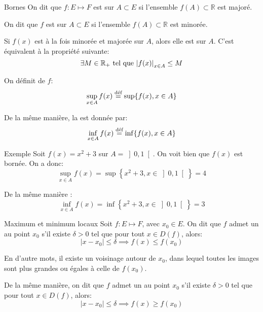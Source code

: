 \documentclass[a4paper]{article}
\begin{document}
\begin{parag}{Bornes}
    On dit que $f : E\mapsto F$ est  sur $A \subset E$ si l'ensemble $f\left(A\right) \subset \mathbb{R}$ est majoré.

    On dit que $f$ est  sur $A \subset E$ si l'ensemble $f\left(A\right) \subset \mathbb{R}$ est minorée.

    Si $f\left(x\right)$ est à la fois minorée et majorée sur $A$, alors elle est  sur $A$. C'est équivalent à la propriété suivante:
    \[\exists M \in \mathbb{R}_+ \telque \left|f\left(x\right)\right|_{x \in A} \leq M\]
    
    On définit  de $f$: 
    \[\sup_{x \in A} f\left(x\right) \over{=}{déf} \sup\left\{f\left(x\right), x \in A\right\}\]

    De la même manière, la  est donnée par: 
    \[\inf_{x \in A} f\left(x\right) \over{=}{déf}  \inf\left\{f\left(x\right), x \in A\right\}\]
\end{parag}

\begin{parag}{Exemple}
    Soit $f\left(x\right) = x^2 + 3$ sur $A = \left]0,1\right[ $. On voit bien que $f\left(x\right)$ est bornée. On a donc: 
    \[\sup_{x \in A} f\left(x\right) = \sup\left\{x^2 + 3, x \in \left]0,1\right[ \right\} = 4\]
    
    De la même manière : 
    \[\inf_{x \in A} f\left(x\right) = \inf\left\{x^2 + 3, x \in \left]0,1\right[ \right\} = 3\]
    
\end{parag}

\begin{parag}{Maximum et minimum locaux}
    Soit $f: E \mapsto F$, avec $x_{0} \in E$. On dit que $f$ admet un  au point $x_0$ s'il existe $\delta > 0$ tel que pour tout $x \in D\left(f\right)$, alors:
    \[\left|x - x_0\right| \leq \delta \implies f\left(x\right) \leq f\left(x_0\right)\]
    
    En d'autre mots, il existe un voisinage autour de $x_0$, dans lequel toutes les images sont plus grandes ou égales à celle de $f\left(x_0\right)$.


    De la même manière, on dit que $f$ admet un  au point $x_0$ s'il existe $\delta > 0$ tel que pour tout $x \in D\left(f\right)$, alors:
    \[\left|x - x_0\right| \leq \delta \implies f\left(x\right) \geq f\left(x_0\right)\]
\end{parag}
\end{document}
